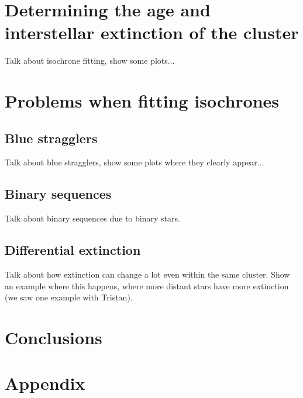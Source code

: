 \documentclass[twocolumn]{revtex4}
\begin{document}
\section{Determining the age and interstellar extinction of the cluster}
Talk about isochrone fitting, show some plots...

\section{Problems when fitting isochrones}
\subsection{Blue stragglers}
Talk about blue stragglers, show some plots where they clearly appear...

\subsection{Binary sequences}
Talk about binary sequences due to binary stars.

\subsection{Differential extinction}
Talk about how extinction can change a lot even within the same cluster. Show an example where this happens, where more distant stars have more extinction (we saw one example with Tristan).

\section{Conclusions}


\section{Appendix}


\vspace*{0.5cm}
\begin{acknowledgments}

\end{acknowledgments}



\end{document}
